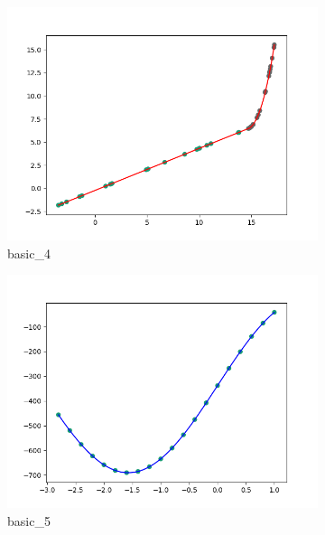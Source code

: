 \documentclass[notitlepage, 11pt]{report}
\begin{document}
\begin{figure}[H]
				\medskip
				\begin{subfigure}{0.25\textwidth}
					\includegraphics[width=\linewidth]{Figure_4}
					\caption{basic\_4}
					\label{fig:4}
				\end{subfigure}\hfil %
				\begin{subfigure}{0.25\textwidth}
					\includegraphics[width=\linewidth]{Figure_5}
					\caption{basic\_5}
					\label{fig:5}
				\end{subfigure}\hfil %
				\begin{subfigure}{0.25\textwidth}

\end{subfigure}
\end{figure}
\end{document}
